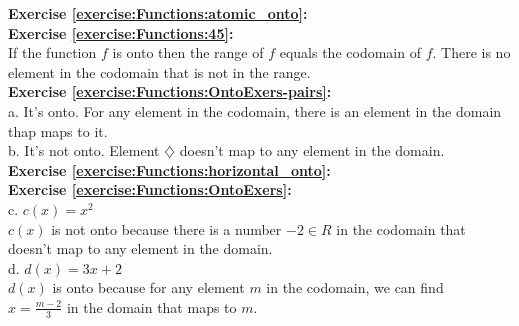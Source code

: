 
\noindent\textbf{Exercise \ref{exercise:Functions:atomic_onto}:}\\

\noindent\textbf{Exercise \ref{exercise:Functions:45}:}\\
If the function $f$ is onto then the range of $f$ equals the codomain of $f$. There is no element in the codomain that is not in the range.\\

\noindent\textbf{Exercise \ref{exercise:Functions:OntoExers-pairs}:}\\
a. It's onto. For any element in the codomain, there is an element in the domain thap maps to it.\\
b. It's not onto. Element $\diamondsuit$ doesn't map to any element in the domain.\\


\noindent\textbf{Exercise \ref{exercise:Functions:horizontal_onto}:}\\

\noindent\textbf{Exercise \ref{exercise:Functions:OntoExers}:}\\
c. $c(x)=x^2$\\
$c(x)$ is not onto because there is a number $-2 \in R$ in the codomain that doesn't map to any element in the domain.\\
d. $d(x)=3x+2$\\
$d(x)$ is onto because for any element $m$ in the codomain, we can find\\ $x=\displaystyle\frac{m-2}{3}$ in the domain that maps to $m$.\\

